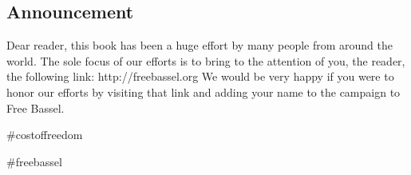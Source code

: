 \subsection{Announcement}\label{announcement}

Dear reader, this book has been a huge effort by many people from around
the world. The sole focus of our efforts is to bring to the attention of
you, the reader, the following link: http://freebassel.org We would be
very happy if you were to honor our efforts by visiting that link and
adding your name to the campaign to Free Bassel.

\#costoffreedom\label{costoffreedom}

\#freebassel\label{freebassel}
